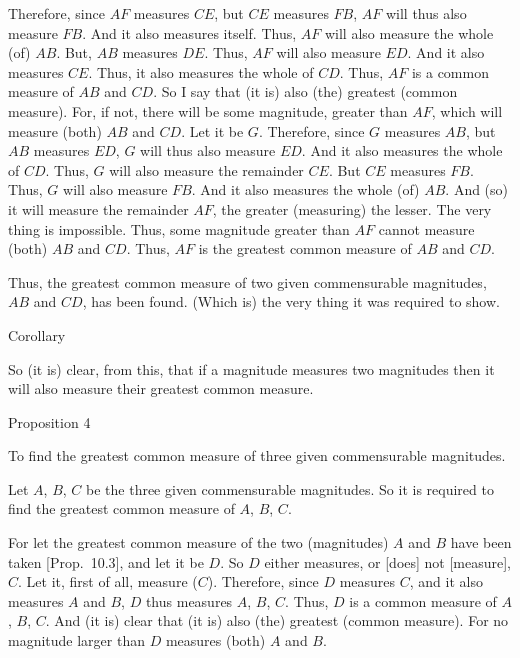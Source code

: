 Therefore, since $AF$ measures $CE$, but $CE$ measures $FB$, $AF$
will thus also measure $FB$. And it also measures itself. Thus, $AF$
will also measure the whole (of) $AB$. But, $AB$ measures $DE$. Thus, $AF$
will also measure $ED$. And it also measures $CE$. Thus, it also measures the whole of $CD$. Thus, $AF$ is a common measure of $AB$ and $CD$.
So I say that (it is) also (the) greatest (common measure). For, if not,
there will be some magnitude, greater than $AF$, which will measure
(both) $AB$ and $CD$. Let it be $G$. Therefore, since $G$ measures $AB$,
but $AB$ measures $ED$, $G$ will thus also measure $ED$. And
it also measures the whole of $CD$. Thus, $G$ will also measure the remainder $CE$.
But $CE$ measures $FB$. Thus, $G$ will also measure $FB$. And
it also measures the whole (of) $AB$. And (so) it will measure the
remainder $AF$, the greater (measuring) the lesser. The very thing is impossible. Thus, some magnitude greater than $AF$ cannot measure
(both) $AB$ and $CD$. Thus, $AF$ is the greatest common measure of
$AB$ and $CD$.

Thus, the greatest common measure of two given commensurable magnitudes, $AB$ and $CD$, has been found. (Which is) the very thing
it was required to show.\\

\begin{center}
{\large Corollary}
\end{center}\vspace*{-7pt}

So (it is) clear, from this, that if a magnitude measures two magnitudes
then it will also measure their greatest common measure.


\begin{center}
{\large Proposition 4}
\end{center}

To find the greatest common measure of three
given commensurable magnitudes.

\epsfysize=1.2in
\centerline{}

Let $A$, $B$, $C$ be the three given commensurable magnitudes. So
it is required to find the greatest common measure of $A$, $B$, $C$.

For let the greatest common measure of the two (magnitudes)
$A$ and $B$ have been taken [Prop.~10.3],
and let it be $D$. So $D$ either measures, or [does] not
[measure], $C$. Let it, first of all, measure ($C$). Therefore, since
$D$ measures $C$, and it also measures $A$ and $B$, $D$ thus
measures $A$, $B$, $C$. Thus, $D$ is a common measure of $A$, $B$, $C$.
And (it is) clear that (it is) also (the) greatest (common measure). For
no magnitude larger than $D$ measures (both) $A$ and $B$.

